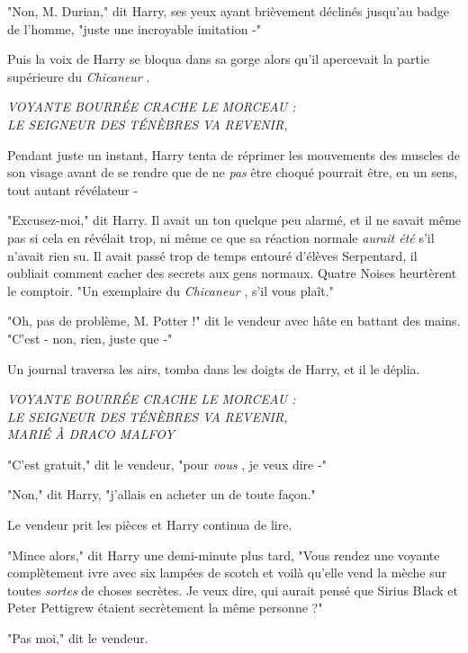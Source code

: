 "Non, M. Durian," dit Harry, ses yeux ayant brièvement déclinés jusqu'au badge de l'homme, "juste une incroyable imitation -"

Puis la voix de Harry se bloqua dans sa gorge alors qu'il apercevait la partie supérieure du \emph{Chicaneur} .


\begin{center}\emph{VOYANTE BOURRÉE CRACHE LE MORCEAU :} \\\emph{} \emph{LE SEIGNEUR DES TÉNÈBRES VA REVENIR,} \end{center}


Pendant juste un instant, Harry tenta de réprimer les mouvements des muscles de son visage avant de se rendre que de ne \emph{pas}  être choqué pourrait être, en un sens, tout autant révélateur -

"Excusez-moi," dit Harry. Il avait un ton quelque peu alarmé, et il ne savait même pas si cela en révélait trop, ni même ce que sa réaction normale \emph{aurait été}  s'il n'avait rien su. Il avait passé trop de temps entouré d'élèves Serpentard, il oubliait comment cacher des secrets aux gens normaux. Quatre Noises heurtèrent le comptoir. "Un exemplaire du \emph{Chicaneur} , s'il vous plaît."

"Oh, pas de problème, M. Potter !" dit le vendeur avec hâte en battant des mains. "C'est - non, rien, juste que -"

Un journal traversa les airs, tomba dans les doigts de Harry, et il le déplia.


\begin{center}\emph{VOYANTE BOURRÉE CRACHE LE MORCEAU :} \\\emph{} \emph{LE SEIGNEUR DES TÉNÈBRES VA REVENIR,} \\\emph{} \emph{MARIÉ À DRACO MALFOY} \end{center}


"C'est gratuit," dit le vendeur, "pour \emph{vous} , je veux dire -"

"Non," dit Harry, "j'allais en acheter un de toute façon."

Le vendeur prit les pièces et Harry continua de lire.

"Mince alors," dit Harry une demi-minute plus tard, "Vous rendez une voyante complètement ivre avec six lampées de scotch et voilà qu'elle vend la mèche sur toutes \emph{sortes}  de choses secrètes. Je veux dire, qui aurait pensé que Sirius Black et Peter Pettigrew étaient secrètement la même personne ?"

"Pas moi," dit le vendeur.

